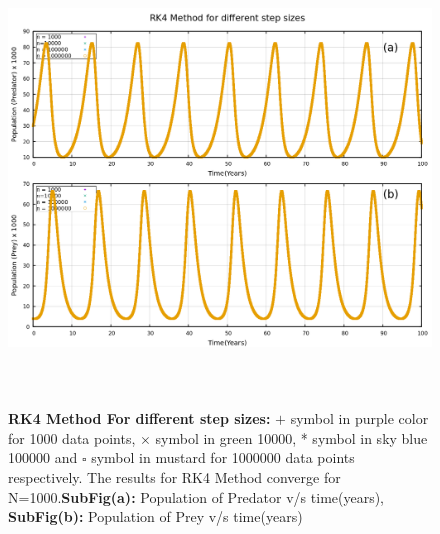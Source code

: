 \documentclass[12pt]{article}
\begin{document}
\newpage
\begin{figure}[h] %
    \centering
    \includegraphics[width=15cm,height=12cm]{rk4_diff_h.png}
\caption{\textbf{RK4 Method For different step sizes:} $+$ symbol in purple color for 1000 data points, $\times$ symbol in green 10000, * symbol in sky blue 100000 and $\square$ symbol in mustard for 1000000 data points respectively. The results for RK4 Method converge for N=1000.\newline \textbf{SubFig(a):} Population of Predator v/s time(years), \textbf{SubFig(b):} Population of Prey v/s time(years)  }
\end{figure}
\newpage
\end{document}
